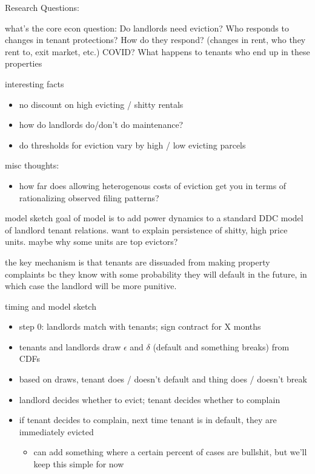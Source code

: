 Research Questions:

what's the core econ question:
Do landlords need eviction?
Who responds to changes in tenant protections?
How do they respond? (changes in rent, who they rent to, exit market, etc.)
COVID?
What happens to tenants who end up in these properties



interesting facts
\begin{itemize}
    \item no discount on high evicting / shitty rentals
    \item how do landlords do/don't do maintenance?
    \item do thresholds for eviction vary by high / low evicting parcels
    
\end{itemize}

misc thoughts:
\begin{itemize}
    \item how far does allowing heterogenous costs of eviction get you in terms of rationalizing observed filing patterns?
\end{itemize}

model sketch
goal of model is to add power dynamics to a standard DDC model of landlord tenant relations. want to explain persistence of shitty, high price units. maybe why some units are top evictors?

the key mechanism is that tenants are dissuaded from making property complaints bc they know with some probability they will default in the future, in which case the landlord will be more punitive.

timing and model sketch
\begin{itemize}
    \item step 0: landlords match with tenants; sign contract for X months
    \item tenants and landlords draw $\epsilon$ and $\delta$ (default and something breaks) from CDFs
    \item based on draws, tenant does / doesn't default and thing does / doesn't break
    \item landlord decides whether to evict; tenant decides whether to complain
    \item if tenant decides to complain, next time tenant is in default, they are immediately evicted
    \begin{itemize}
        \item can add something where a certain percent of cases are bullshit, but we'll keep this simple for now
    \end{itemize}
\end{itemize}

